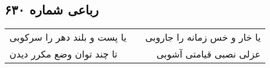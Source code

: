 \begin{center}
\section*{رباعی شماره ۶۳۰}
\label{sec:sh630}
\begin{longtable}{l p{0.5cm} r}
یا پست و بلند دهر را سرکوبی
&&
یا خار و خس زمانه را جاروبی
\\
تا چند توان وضع مکرر دیدن
&&
عزلی نصبی قیامتی آشوبی
\\
\end{longtable}
\end{center}
